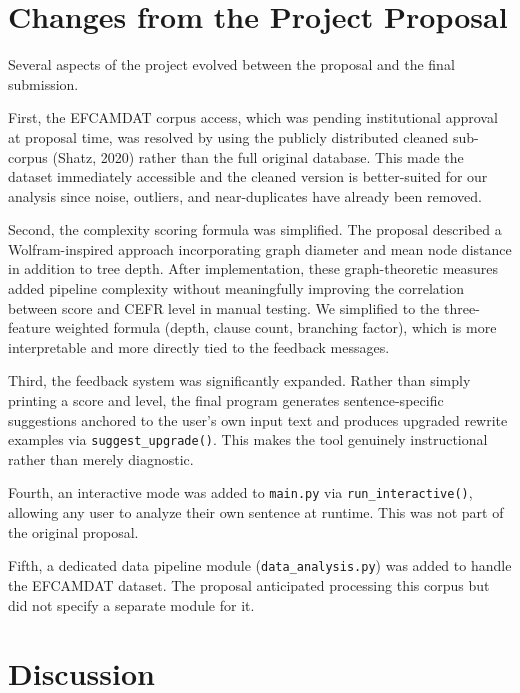 \documentclass[11pt]{article}
\begin{document}
\section*{Changes from the Project Proposal}
 
Several aspects of the project evolved between the proposal and the final submission.
 
First, the EFCAMDAT corpus access, which was pending institutional approval at proposal time, was resolved by using the publicly distributed cleaned sub-corpus (Shatz, 2020) \cite{efcamdat} rather than the full original database. This made the dataset immediately accessible and the cleaned version is better-suited for our analysis since noise, outliers, and near-duplicates have already been removed.
 
Second, the complexity scoring formula was simplified. The proposal described a Wolfram-inspired approach \cite{wolfram} incorporating graph diameter and mean node distance in addition to tree depth. After implementation, these graph-theoretic measures added pipeline complexity without meaningfully improving the correlation between score and CEFR level in manual testing. We simplified to the three-feature weighted formula (depth, clause count, branching factor), which is more interpretable and more directly tied to the feedback messages.
 
Third, the feedback system was significantly expanded. Rather than simply printing a score and level, the final program generates sentence-specific suggestions anchored to the user's own input text and produces upgraded rewrite examples via \texttt{suggest\_upgrade()}. This makes the tool genuinely instructional rather than merely diagnostic.
 
Fourth, an interactive mode was added to \texttt{main.py} via \texttt{run\_interactive()}, allowing any user to analyze their own sentence at runtime. This was not part of the original proposal.
 
Fifth, a dedicated data pipeline module (\texttt{data\_analysis.py}) was added to handle the EFCAMDAT dataset. The proposal anticipated processing this corpus but did not specify a separate module for it.
 
\section*{Discussion}
 
\end{document}
